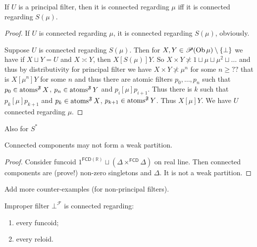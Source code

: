 \begin{prop}
  If $U$ is a principal filter, then it is connected regarding $\mu$ iff it is
  connected regarding $S (\mu)$.
\end{prop}

\begin{proof}
  If $U$ is connected regarding $\mu$, it is connected regarding $S (\mu)$,
  obviously.

  Suppose $U$ is connected regarding $S (\mu)$. Then for $X, Y \in \mathscr{P}
  (\operatorname{Ob} \mu) \setminus \{ \bot \}$ we have if $X \sqcup Y = U$ and $X
  \asymp Y$, then $X \mathrel{[S (\mu)]} Y$. So $X \times Y \nasymp 1 \sqcup
  \mu \sqcup \mu^2 \sqcup \ldots$ and thus by distributivity for principal
  filter we have $X \times Y \nasymp \mu^n$ for some $n \geq ? ?$ that is $X
  \mathrel{[\mu^n]} Y$ for some $n$ and thus there are atomic filters $p_0,
  \ldots, p_n$ such that $p_0 \in \operatorname{atoms}^{\mathfrak{F}} X$, $p_n \in
  \operatorname{atoms}^{\mathfrak{F}} Y$ and $p_i \mathrel{[\mu]} p_{i + 1}$. Thus
  there is $k$ such that $p_k \mathrel{[\mu]} p_{k + 1}$ and $p_k \in
  \operatorname{atoms}^{\mathfrak{F}} X$, $p_{k + 1} \in \operatorname{atoms}^{\mathfrak{F}}
  Y$. Thus $X \mathrel{[\mu]} Y$. We have $U$ connected regarding $\mu$.
\end{proof}

Also for $S^{\ast}$

\begin{example}
  Connected components may not form a weak partition.
\end{example}

\begin{proof}
  Consider funcoid $1^{\mathsf{FCD}(\mathbb{R})}\sqcup(\Delta \times^{\mathsf{FCD}} \Delta)$ on real line.
  Then connected components are (prove!) non-zero singletons and $\Delta$. It
  is not a weak partition.
\end{proof}

Add more counter-examples (for non-principal filters).


\begin{obvious}
Improper filter $\bot^{\mathscr{F}}$ is connected regarding:
\begin{enumerate}
  \item every funcoid;
  \item every reloid.
\end{enumerate}{\hspace*{\fill}}{\medskip}
\end{obvious}

